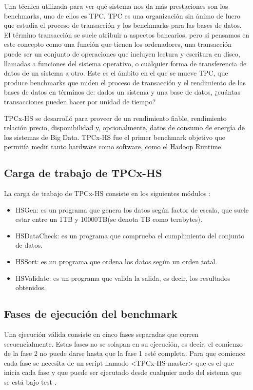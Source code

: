 \documentclass[10pt]{article}
\begin{document}
	Una técnica utilizada para ver qué sistema nos da más prestaciones son los benchmarks, uno de ellos es TPC. TPC es una organización sin ánimo de lucro que estudia el proceso de transacción y los benchmarks para las bases de datos. El término transacción se suele atribuir a aspectos bancarios, pero si pensamos en este concepto como una función que tienen los ordenadores, una transacción puede ser un conjunto de operaciones que incluyen lectura y escritura en disco, llamadas a funciones del sistema operativo, o cualquier forma de transferencia de datos de un sistema a otro. Este es el ámbito en el que se mueve TPC, que produce benchmarks que miden el proceso de transacción y el rendimiento de las bases de datos en términos de: dados un sistema y una base de datos, ¿cuántas transacciones pueden hacer por unidad de tiempo?\cite{intro-tpc}
	
	TPCx-HS se desarrolló para proveer de un rendimiento fiable, rendimiento relación precio, disponibilidad y, opcionalmente, datos de consumo de energía de los sistemas de Big Data. TPCx-HS fue el primer benchmark objetivo que permitía medir tanto hardware como software, como el Hadoop Runtime. \cite{info-tpc}
	
	\subsection{Carga de trabajo de TPCx-HS}
	
		La carga de trabajo de TPCx-HS consiste en los siguientes módulos \cite{tpcxhs}:
		
		\begin{itemize}
			\item HSGen: es un programa que genera los datos según factor de escala, que suele estar entre un 1TB y 10000TB(se denota TB como terabytes).
			\item HSDataCheck: es un programa que comprueba el cumplimiento del conjunto de datos.
			\item HSSort: es un programa que ordena los datos según un orden total.
			\item HSValidate: es un programa que valida la salida, es decir, los resultados obtenidos.
		\end{itemize}
	
	\subsection{Fases de ejecución del benchmark}
	
		Una ejecución válida consiste en cinco fases separadas que corren secuencialmente. Estas fases no se solapan en su ejecución, es decir, el comienzo de la fase 2 no puede darse hasta que la fase 1 esté completa. Para que comience cada fase se necesita de un script llamado <TPCx-HS-master> que es el que inicia cada fase y que puede ser ejecutado desde cualquier nodo del sistema que se está bajo test \cite{tpcxhs}.
		
\end{document}
